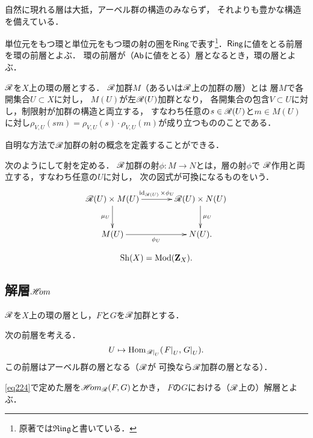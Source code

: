 自然に現れる層は大抵，アーベル群の構造のみならず，
それよりも豊かな構造を備えている．

単位元をもつ環と単位元をもつ環の射の圏を\(\Ring\)で表す\footnote{
    原著では\(\mathfrak{Ring}\)と書いている．
}．\(\Ring\)に値をとる前層を環の前層とよぶ．
環の前層が（\(\cAb\)に値をとる）層となるとき，環の層とよぶ．

\begin{DFN}
    \(\scR\)を\(X\)上の環の層とする．
    \(\scR\)加群\(M\)（あるいは\(\scR\)上の加群の層）とは
    層\(M\)で各開集合\(U\subset X\)に対し，
    \(M(U)\)が左\(\scR(U)\)加群となり，
    各開集合の包含\(V\subset U\)に対し，制限射が加群の構造と両立する，
    すなわち任意の\(s\in\scR(U)\)と\(m\in M(U)\)に対し\(
        \rho_{V,U}(sm)=\rho_{V,U}(s)\cdot\rho_{V,U}(m)
    \)が成り立つもののことである．
\end{DFN}

自明な方法で\(\scR\)加群の射の概念を定義することができる．

\begin{CMT*}
    次のようにして射を定める．
    \(\scR\)加群の射\(\phi\colon M\to N\)とは，層の射\(\phi\)で
    \(\scR\)作用と両立する，すなわち任意の\(U\)に対し，
    次の図式が可換になるものをいう．
    \[\vcenter{\xymatrix@C=36pt@R=26pt{
    \scR(U)\times M(U)
    \ar[r]^-{\id_{\scR(U)}\times\phi_U}
    \ar[d]_-{\mu_{U}}
    &
    \scR(U)\times N(U)\ar[d]^-{\mu_{U}} 
    \\
    M(U)\ar[r]_-{\phi_U}
    &
    N(U).
    }}\]
\end{CMT*}
\begin{equation}
    \Sh(X)=\Mod(\zz_X).
\end{equation}
\subsection*{解層\(\HOM\)}
\(\scR\)を\(X\)上の環の層とし，\(F\)と\(G\)を\(\scR\)加群とする．

\begin{leftbar}
\begin{DFN}
    次の前層を考える．
    \begin{equation}\label{eq224}
        U\mapsto \Hom_{\mres[\scR]{U}}(\mres[F]{U},\mres[G]{U}).
    \end{equation}
    この前層はアーベル群の層となる（\(\scR\)が
    可換なら\(\scR\)加群の層となる）．

    \eqref{eq224}で定めた層を\(\HOM_{\scR}(F,G)\)とかき，
    \(F\)の\(G\)における（\(\scR\)上の）解層とよぶ．
\end{DFN}
\end{leftbar}


